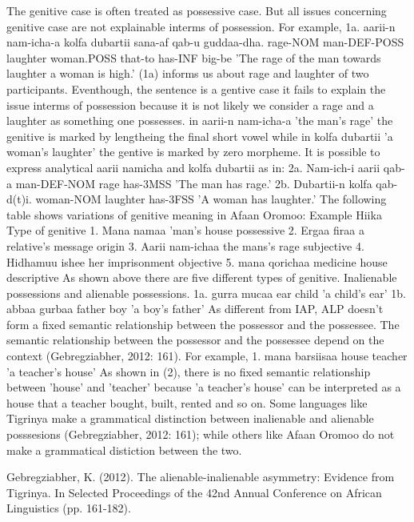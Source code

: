 \documentclass[11pt,a4paper]{article}
\begin{document}
	The genitive case is often treated as possessive case. But all issues concerning genitive case are not explainable interms of possession. For example, 
	1a. aarii-n nam-icha-a kolfa dubartii sana-af qab-u guddaa-dha. rage-NOM man-DEF-POSS laughter woman.POSS that-to has-INF big-be ’The rage of the man towards laughter a woman is high.’ 
	(1a) informs us about rage and laughter of two participants. Eventhough, the sentence is a gentive case it fails to explain the issue interms of possession because it is not likely we consider a rage and a laughter as something one possesses. in aarii-n nam-icha-a ’the man’s rage’ the genitive is marked by lengtheing the final short vowel while in kolfa dubartii ’a woman’s laughter’ the gentive is marked by zero morpheme. 
	It is possible to express analytical aarii namicha and kolfa dubartii as in: 2a. Nam-ich-i aarii qab-a man-DEF-NOM rage has-3MSS ’The man has rage.’ 
	2b. Dubartii-n kolfa qab-d(t)i. woman-NOM laughter has-3FSS ’A woman has laughter.’ 
	The following table shows variations of genitive meaning in Afaan Oromoo: 
	Example Hiika Type of genitive 
	1. Mana namaa ’man’s house possessive 
	2. Ergaa firaa a relative’s message origin 
	3. Aarii nam-ichaa the mans’s rage subjective 
	4. Hidhamuu ishee her imprisonment objective 
	5. mana qorichaa medicine house descriptive 
	As shown above there are five different types of genitive. 
	Inalienable possessions and alienable possessions. 1a. gurra mucaa ear child ’a child’s ear’ 
	1b. abbaa gurbaa father boy ’a boy’s father’ 
	As different from IAP, ALP doesn’t form a fixed semantic relationship between the possessor and the possessee. The semantic relationship between the possessor and the possessee depend on the context (Gebregziabher, 2012: 161). For example, 
	1. mana barsiisaa house teacher ’a teacher’s house’ 
	As shown in (2), there is no fixed semantic relationship between ’house’ and ’teacher’ because ’a teacher’s house’ can be interpreted as a house that a teacher bought, built, rented and so on. Some languages like Tigrinya make a grammatical distinction between inalienable and alienable posssesions (Gebregziabher, 2012: 161); while others like Afaan Oromoo do not make a grammatical distiction between the two. 





	
	
	
	Gebregziabher, K. (2012). The alienable-inalienable asymmetry: Evidence from Tigrinya. 
	In Selected Proceedings of the 42nd Annual Conference on African Linguistics (pp. 161-182).
	
\end{document}
